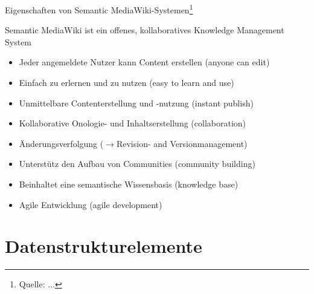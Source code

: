 \documentclass[aspectratio=1610,onlymath]{beamer}
\begin{document}
\begin{frame}{Eigenschaften von Semantic MediaWiki-Systemen\footnote{Quelle: ...}}

Semantic MediaWiki ist ein \alert{offenes}, \alert{kollaboratives} Knowledge Management System \par
\begin{itemize}
	\item Jeder angemeldete Nutzer kann Content erstellen (anyone can edit)
	\item Einfach zu erlernen und zu nutzen (easy to learn and use)
	\item Unmittelbare Contenterstellung und -nutzung (instant publish)
	\item Kollaborative Onologie- und Inhaltserstellung (collaboration)
	\item Änderungsverfolgung ($\rightarrow$Revision- and Versionmanagement) 
	\item Unterstütz den Aufbau von Communities (community building)
	\item Beinhaltet eine semantische Wissensbasis (knowledge base)
	\item Agile Entwicklung (agile development)
\end{itemize}

\end{frame}



\section{Datenstrukturelemente} %
\label{sec:datenstrukturelemente}
\end{document}

